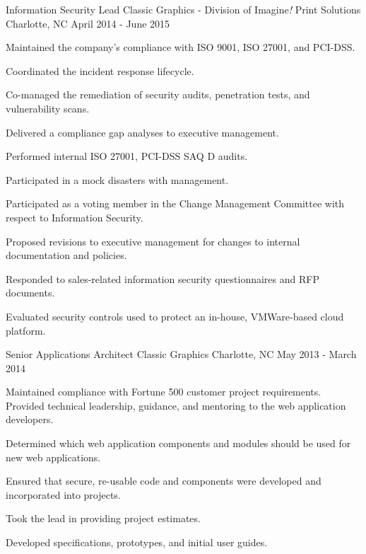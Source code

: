 \begin{cventries}

\cventry
{Information Security Lead}
{Classic Graphics - Division of Imagine{\it !} Print Solutions} %
{Charlotte, NC} %
{April 2014 - June 2015} %
{
Maintained the company's compliance with ISO 9001, ISO 27001, and PCI-DSS.
\begin{cvitems}
\item[]
\item {Coordinated the incident response lifecycle.}
\item {Co-managed the remediation of security audits, penetration tests, and vulnerability scans.}
\item {Delivered a compliance gap analyses to executive management.}
\item {Performed internal ISO 27001, PCI-DSS SAQ D audits.}
\item {Participated in a mock disasters with management.}
\item {Participated as a voting member in the Change Management Committee with respect to Information Security.}
\item {Proposed revisions to executive management for changes to internal documentation and policies.}
\item {Responded to sales-related information security questionnaires and RFP documents.}
\item {Evaluated security controls used to protect an in-house, VMWare-based cloud platform.}
\end{cvitems}
}


\cventry
{Senior Applications Architect}
{Classic Graphics} %
{Charlotte, NC} %
{May 2013 - March 2014} %
{
Maintained compliance with Fortune 500 customer project requirements. Provided technical leadership, guidance, and mentoring to the web application developers.
\begin{cvitems}
\item[]
\item {Determined which web application components and modules should be used for new web applications.}
\item {Ensured that secure, re-usable code and components were developed and incorporated into projects.}
\item {Took the lead in providing project estimates.}
\item {Developed specifications, prototypes, and initial user guides.}
\end{cvitems}
}


\end{cventries}
